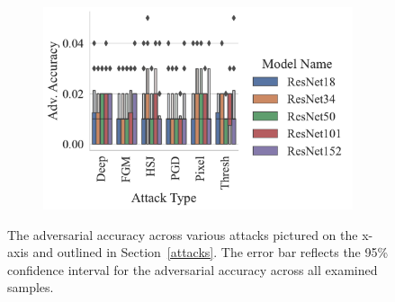 \begin{figure}[h!]
\begin{subfigure}[]{0.36\textwidth}
    \centering
    \includegraphics[width=\textwidth]{cifar100/adv_accuracy_vs_attack_type.pdf}
\end{subfigure}
\caption{The adversarial accuracy across various attacks pictured on the x-axis and outlined in Section~\ref{attacks}. The error bar reflects the 95\% confidence interval for the adversarial accuracy across all examined samples.}
\label{fig:cifar100_accuracies}
\end{figure}

